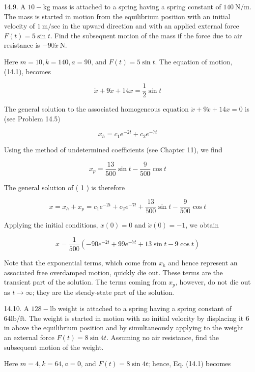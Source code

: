 \documentclass[10pt]{article}
\begin{document}
14.9. A $10-\mathrm{kg}$ mass is attached to a spring having a spring constant of $140 \mathrm{~N} / \mathrm{m}$. The mass is started in motion from the equilibrium position with an initial velocity of $1 \mathrm{~m} / \mathrm{sec}$ in the upward direction and with an applied external force $F(t)=5 \sin t$. Find the subsequent motion of the mass if the force due to air resistance is $-90 \dot{x} \mathrm{~N}$.

Here $m=10, k=140, a=90$, and $F(t)=5 \sin t$. The equation of motion, (14.1), becomes


\begin{equation*}
\ddot{x}+9 \dot{x}+14 x=\frac{1}{2} \sin t \tag{1}
\end{equation*}


The general solution to the associated homogeneous equation $\ddot{x}+9 \dot{x}+14 x=0$ is (see Problem 14.5)

$$
x_{h}=c_{1} e^{-2 t}+c_{2} e^{-7 t}
$$

Using the method of undetermined coefficients (see Chapter 11), we find


\begin{equation*}
x_{p}=\frac{13}{500} \sin t-\frac{9}{500} \cos t \tag{2}
\end{equation*}


The general solution of ( 1 ) is therefore

$$
x=x_{h}+x_{p}=c_{1} e^{-2 t}+c_{2} e^{-7 t}+\frac{13}{500} \sin t-\frac{9}{500} \cos t
$$

Applying the initial conditions, $x(0)=0$ and $\dot{x}(0)=-1$, we obtain

$$
x=\frac{1}{500}\left(-90 e^{-2 t}+99 e^{-7 t}+13 \sin t-9 \cos t\right)
$$

Note that the exponential terms, which come from $x_{h}$ and hence represent an associated free overdamped motion, quickly die out. These terms are the transient part of the solution. The terms coming from $x_{p}$, however, do not die out as $t \rightarrow \infty$; they are the steady-state part of the solution.

14.10. A $128-\mathrm{lb}$ weight is attached to a spring having a spring constant of $64 \mathrm{lb} / \mathrm{ft}$. The weight is started in motion with no initial velocity by displacing it 6 in above the equilibrium position and by simultaneously applying to the weight an external force $F(t)=8 \sin 4 t$. Assuming no air resistance, find the subsequent motion of the weight.

Here $m=4, k=64, a=0$, and $F(t)=8 \sin 4 t$; hence, Eq. (14.1) becomes
\end{document}
